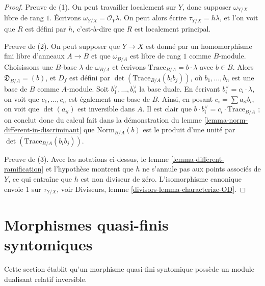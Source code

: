 \begin{proof}
Preuve de (1). On peut travailler localement sur $Y$, donc supposer
$\omega_{Y/X}$ libre de rang $1$. Écrivons $\omega_{Y/X} = \mathcal{O}_Y\lambda$.
On peut alors écrire $\tau_{Y/X} = h \lambda$, et l'on voit que
$R$ est défini par $h$, c'est-à-dire que $R$ est localement principal.

\medskip\noindent
Preuve de (2). On peut supposer que $Y \to X$ est donné par un homomorphisme fini libre
d'anneaux $A \to B$ et que $\omega_{B/A}$ est libre de rang $1$ comme $B$-module.
Choisissons une $B$-base $\lambda$ de $\omega_{B/A}$ et écrivons
$\text{Trace}_{B/A} = b \cdot \lambda$ avec $b \in B$.
Alors $\mathfrak{D}_{B/A} = (b)$, et $D_f$ est défini par
$\det(\text{Trace}_{B/A}(b_ib_j))$, où $b_1, \ldots, b_n$ est une
base de $B$ comme $A$-module. Soit $b_1^\vee, \ldots, b_n^\vee$
la base duale.
En écrivant $b_i^\vee = c_i \cdot \lambda$, on voit que
$c_1, \ldots, c_n$ est également une base de $B$.
Ainsi, en posant $c_i = \sum a_{il}b_l$, on voit que $\det(a_{il})$
est inversible dans $A$. Il est clair que
$b \cdot b_i^\vee = c_i \cdot \text{Trace}_{B/A}$ ;
on conclut donc du calcul fait dans la démonstration du
lemme \ref{lemma-norm-different-in-discriminant}
que $\text{Norm}_{B/A}(b)$ est le produit d'une unité par
$\det(\text{Trace}_{B/A}(b_ib_j))$.

\medskip\noindent
Preuve de (3). Avec les notations ci-dessus, le
lemme \ref{lemma-different-ramification} et l'hypothèse montrent
que $h$ ne s'annule pas aux
points associés de $Y$, ce qui entraîne que $h$ est non diviseur de zéro.
L'isomorphisme canonique envoie $1$ sur $\tau_{Y/X}$, voir
Diviseurs, lemme \ref{divisors-lemma-characterize-OD}.
\end{proof}







\section{Morphismes quasi-finis syntomiques}
\label{section-quasi-finite-syntomic}

\noindent
Cette section établit qu'un morphisme quasi-fini syntomique
possède un module dualisant relatif inversible.

